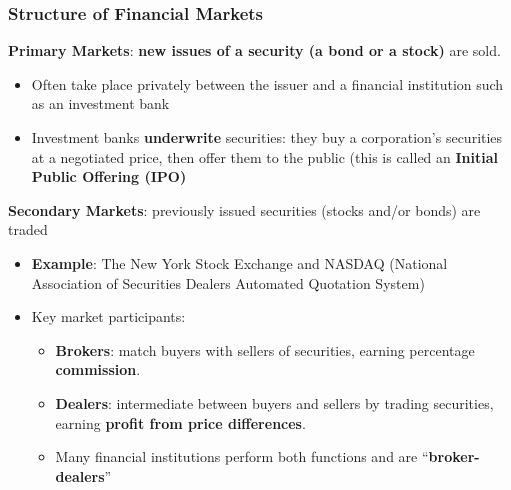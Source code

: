 \documentclass[aspectratio=169]{beamer}
\begin{document}
\begin{frame}
\frametitle{Structure of Financial Markets}

\textbf{Primary Markets}: \textbf{new issues of a security (a bond or a stock)}  are sold.
\begin{itemize}
    \item Often take place privately between the issuer and a financial institution such as an investment bank 
    \item Investment banks \textbf{underwrite} securities: they buy a corporation’s securities at a negotiated price, then offer them to the public (this is called an \textbf{Initial Public Offering (IPO)} 
\end{itemize} \pause 

\medskip 

\textbf{Secondary Markets}: previously issued securities (stocks and/or bonds) are traded
\begin{itemize}
    \item \textbf{Example}: The New York Stock Exchange and NASDAQ (National Association of Securities Dealers Automated Quotation System)
    \item Key market participants: 
    \begin{itemize}
        \item \textbf{Brokers}: match buyers with sellers of securities, earning percentage \textbf{commission}.
        \item \textbf{Dealers}: intermediate between buyers and sellers by trading securities, earning \textbf{profit from price differences}.
        \item Many financial institutions perform both functions and are ``\textbf{broker-dealers}''
    \end{itemize}
\end{itemize}


\end{frame}
\end{document}
